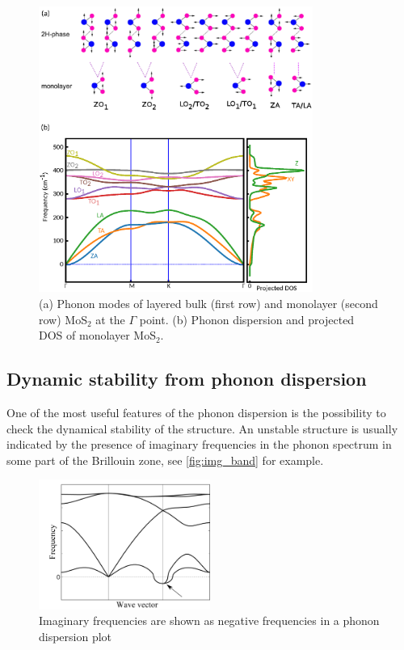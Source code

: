 \begin{figure}[htbp!] 
\centering  
\includegraphics[width=0.8\textwidth]{ph_mos2.eps}
\caption[The phonon modes at the $\Gamma$ point and the dispersion of MoS$_2$]{ (a) Phonon modes of layered bulk (first row) and monolayer (second row) MoS$_2$ at the $\Gamma$ point. (b) Phonon dispersion and projected DOS of monolayer MoS$_2$.}  
\label{fig:mos2_ph}
\end{figure} 


\subsection{Dynamic stability from phonon dispersion}

One of the most useful features of the phonon dispersion is the possibility to check the dynamical stability of the structure. An unstable structure is usually indicated by the presence of imaginary frequencies in the phonon spectrum in some part of the Brillouin zone, see \autoref{fig:img_band} for example. 


\begin{figure}[htb] 
\centering  
\includegraphics[width=0.5\textwidth]{img_band.png}
\caption{Imaginary frequencies are shown as negative frequencies in a phonon dispersion plot}  
\label{fig:img_band}
\end{figure} 

